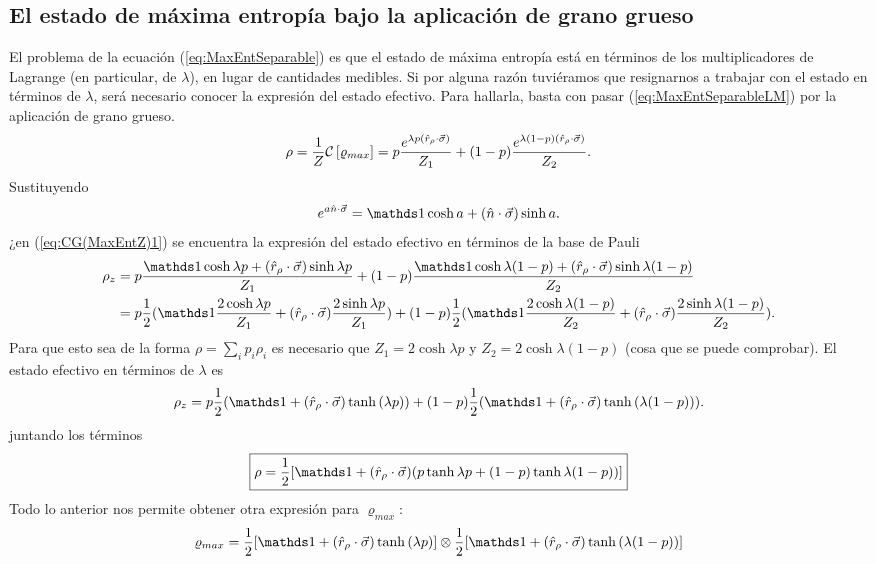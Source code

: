 \subsection{El estado de máxima entropía bajo la aplicación de grano grueso}\label{sec:CG(MaxEnt)}
El problema de la ecuación (\ref{eq:MaxEntSeparable}) es que el estado de máxima entropía está en términos de los multiplicadores de Lagrange (en particular, de $\lambda$), en lugar de cantidades medibles. Si por alguna razón tuviéramos que resignarnos a trabajar con el estado en términos de $\lambda$, será necesario conocer la expresión del estado efectivo. Para hallarla, basta con pasar (\ref{eq:MaxEntSeparableLM}) por la aplicación de grano grueso.
\begin{equation}\label{eq:CG(MaxEntZ)1}
    \rho=\frac{1}{Z}\mathcal{C}\left[\varrho_{max}\right]=p\frac{e^{\lambda p(\hat{r}_{\rho}\cdot\vec{\sigma})}}{Z_{1}}+(1-p)\frac{e^{\lambda (1-p)(\hat{r}_{\rho}\cdot\vec{\sigma})}}{Z_{2}}.
\end{equation}
Sustituyendo
\begin{equation}\label{eq:PauliVectorExp}
    e^{a\hat{n}\cdot \vec{\sigma}}=\Id \cosh{a}+(\hat{n}\cdot \vec{\sigma})\sinh{a}.
\end{equation}
¿en (\ref{eq:CG(MaxEntZ)1}) se encuentra la expresión del estado efectivo en términos de la base de Pauli
\begin{align*}
    \rho_{z}&=p\frac{\Id \cosh{\lambda p}+(\hat{r}_{\rho}\cdot\vec{\sigma})\sinh{\lambda p}}{Z_{1}}+(1-p)\frac{\Id \cosh{\lambda (1-p)}+(\hat{r}_{\rho}\cdot\vec{\sigma})\sinh{\lambda (1-p)}}{Z_{2}}\\
    &=p\frac{1}{2}(\Id \frac{2\cosh{\lambda p}}{Z_{1}}+(\hat{r}_{\rho}\cdot\vec{\sigma})\frac{2\sinh{\lambda p}}{Z_{1}})+(1-p)\frac{1}{2}(\Id \frac{2\cosh{\lambda (1-p)}}{Z_{2}}+(\hat{r}_{\rho}\cdot\vec{\sigma})\frac{2\sinh{\lambda (1-p)}}{Z_{2}}).
\end{align*}
Para que esto sea de la forma $\rho=\sum_{i}p_{i}\rho_{i}$ es necesario que $Z_{1}=2\cosh{\lambda p}$ y $Z_{2}=2\cosh{\lambda (1-p)}$ (cosa que se puede comprobar). El estado efectivo en términos de $\lambda $ es
\begin{equation}\label{eq:CG(MaxEntZ)2}
    \rho_{z}=p\frac{1}{2}(\Id+(\hat{r}_{\rho}\cdot\vec{\sigma})\tanh{(\lambda p)})+(1-p)\frac{1}{2}(\Id+(\hat{r}_{\rho}\cdot\vec{\sigma})\tanh{(\lambda (1-p))}).
\end{equation}
juntando los términos
\begin{equation}\label{eq:CG(MaxEnt)}
  \boxed{\rho=\frac{1}{2}[\Id+(\hat{r}_{\rho}\cdot\vec{\sigma})(p\tanh{\lambda p}+(1-p)\tanh{\lambda (1-p)})]}
\end{equation}
Todo lo anterior nos permite obtener otra expresión para $\varrho_{max}$:
\begin{equation*}
  \varrho_{max}=\frac{1}{2}\qty[\Id+(\hat{r}_{\rho}\cdot\vec{\sigma})\tanh{(\lambda p)}]\otimes\frac{1}{2}\qty[\Id+(\hat{r}_{\rho}\cdot\vec{\sigma})\tanh{(\lambda (1-p))}]
\end{equation*}
